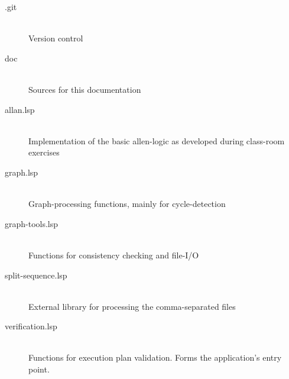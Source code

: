         \begin{description}
            \item[.git] \hfill \\
                Version control
            \item[doc] \hfill \\
                Sources for this documentation
            \item[allan.lsp] \hfill \\
                Implementation of the basic allen-logic as developed during
                class-room exercises
            \item[graph.lsp] \hfill \\
                Graph-processing functions, mainly for cycle-detection
            \item[graph-tools.lsp] \hfill \\
                Functions for consistency checking and file-I/O
            \item[split-sequence.lsp] \hfill \\
                External library for processing the comma-separated files
            \item[verification.lsp] \hfill \\
                Functions for execution plan validation. Forms the application's
                entry point.
        \end{description}
    
    
    
    
    
    
    
    
    
    
    
    
    
    
    
    
    
    
    
    
    
    
    
    
    
    
    
    
    
    
    
    